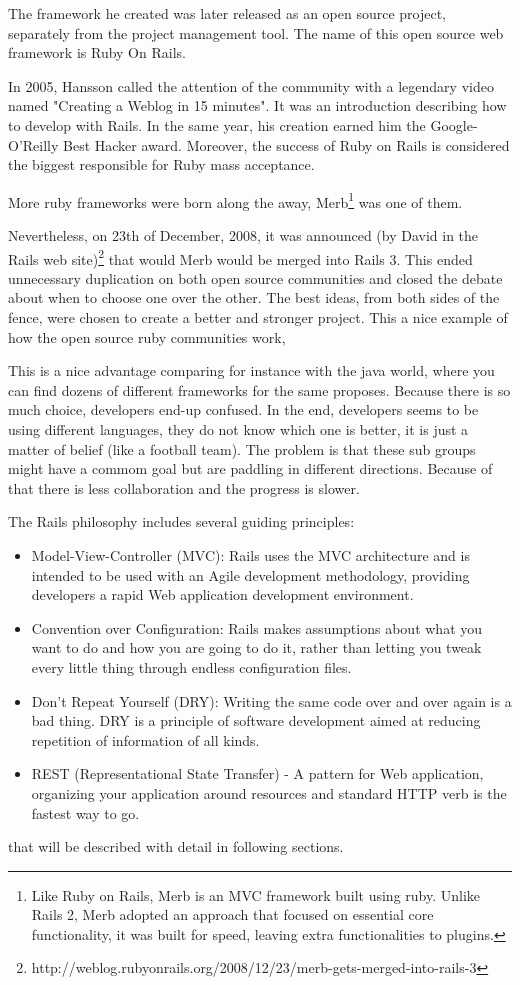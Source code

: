 The framework he created was later released as an open source project, separately from the project management tool. 
The name of this open source web framework is Ruby On Rails.

In 2005, Hansson called the attention of the community with a legendary video named "Creating a Weblog in 15 minutes". 
It was an introduction describing how to develop with Rails.
In the same year, his creation earned him the Google-O'Reilly Best Hacker award.
Moreover, the success of Ruby on Rails is considered the biggest responsible for Ruby mass acceptance.

More ruby frameworks were born along the away, 
\textsf{Merb}\footnote{
 Like Ruby on Rails, Merb is an MVC framework built using ruby.
 Unlike Rails 2, Merb adopted an approach that focused on essential core functionality, 
 it was built for speed, leaving extra functionalities to plugins.
}
was one of them.

Nevertheless, on 23th of December, 2008, it was announced
\textsf{(by David in the Rails web site)}\footnote{
 http://weblog.rubyonrails.org/2008/12/23/merb-gets-merged-into-rails-3
}
that
would Merb would be merged into Rails 3.
This ended unnecessary duplication on both open source communities 
and closed the debate about when to choose one over the other.
The best ideas, from both sides of the fence, were chosen to create a better and stronger project.
This a nice example of how the open source ruby communities work, 

This is a nice advantage comparing for instance with the java world, 
where you can find dozens of different frameworks for the same proposes.
Because there is so much choice, developers end-up confused.
In the end, developers seems to be using different languages,
they do not know which one is better, it is just a matter of belief (like a football team).
The problem is that these sub groups might have a commom goal but
are paddling in different directions.
Because of that there is less collaboration and the progress is slower.

The Rails philosophy includes several guiding principles:
\begin{itemize}
\item Model-View-Controller (MVC): Rails uses the MVC architecture and 
      is intended to be used with an Agile development methodology,
      providing developers a rapid Web application development environment.
\item Convention over Configuration: Rails makes assumptions about 
      what you want to do and how you are going to do it, 
      rather than letting you tweak every little thing through endless configuration files.
\item Don’t Repeat Yourself (DRY): Writing the same code over and over again is a bad thing. 
      DRY is a principle of software development aimed at reducing repetition of information of all kinds.
\item REST (Representational State Transfer) - A pattern for Web application, 
      organizing your application around resources and standard HTTP verb is the fastest way to go.
\end{itemize}
that will be described with detail in following sections.


